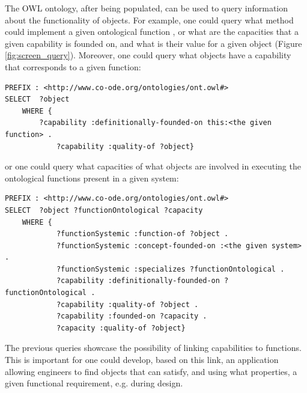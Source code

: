 \documentclass[sw]{iosart2x}
\newcommand{\OWL}{\textnormal{OWL}\xspace}
\newcommand{\TODO}[1]{{\color{red} #1}}
\newcommand{\myComment}[1]{}
\begin{document}
The \OWL ontology, after being populated, can be used to query information about the functionality of objects. For example, one could query what method could implement a given ontological function \myComment{\TODO{check if true}}, or what are the capacities that a given capability is founded on, and what is their value for a given object (Figure \ref{fig:screen_query}). Moreover, one could query  
what objects have a capability that corresponds to a given function:
\begin{verbatim}
PREFIX : <http://www.co-ode.org/ontologies/ont.owl#>
SELECT  ?object
	WHERE { 
	    ?capability :definitionally-founded-on this:<the given function> .
		    ?capability :quality-of ?object}
\end{verbatim}

or one could query what capacities of what objects are  involved in executing the ontological functions present in a given system:
\begin{verbatim}
PREFIX : <http://www.co-ode.org/ontologies/ont.owl#>
SELECT  ?object ?functionOntological ?capacity
	WHERE { 
		    ?functionSystemic :function-of ?object .
		    ?functionSystemic :concept-founded-on :<the given system> .
		    ?functionSystemic :specializes ?functionOntological .
		    ?capability :definitionally-founded-on ?functionOntological .
		    ?capability :quality-of ?object .
		    ?capability :founded-on ?capacity .
		    ?capacity :quality-of ?object}
\end{verbatim}

The previous queries showcase the possibility of linking capabilities to functions. This is important for one could develop, based on this link, an application allowing engineers to find objects that can satisfy, and using what properties, a given functional requirement, e.g. during design.
\end{document}
